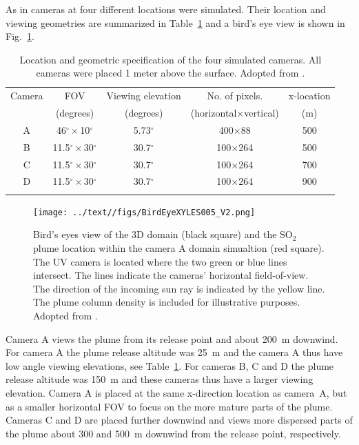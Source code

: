 \documentclass[amtd, manuscript]{copernicus}
\begin{document}
As in \citet{Kylling2020} cameras at four different locations were
simulated. Their location and viewing geometries are summarized in
Table~\ref{tab:CameraInfo} and a bird's eye view is shown in Fig.~\ref{fig:ExpSetup}.
\begin{table}[t]
  \caption[]
          {\label{tab:CameraInfo}
            Location and geometric specification of the four simulated cameras.
            All cameras  were placed 1 meter above the
            surface. Adopted from  \citet{Kylling2020}.}
          \begin{tabular}{ccccc}
            \tophline
            Camera & FOV & Viewing elevation &          No. of pixels. & x-location \\
            & (degrees)  &  (degrees) & (horizontal$\times$vertical)& (m)\\
            \middlehline
            A & 46$^\circ\times$10$^\circ$ & 5.73$^\circ$ & 400$\times$88 &  500   \\
            B & 11.5$^\circ\times$30$^\circ$ & 30.7$^\circ$ & 100$\times$264 &  500   \\
            C & 11.5$^\circ\times$30$^\circ$ & 30.7$^\circ$ & 100$\times$264 &  700   \\
            D & 11.5$^\circ\times$30$^\circ$ & 30.7$^\circ$ & 100$\times$264 &  900   \\
            \bottomhline
          \end{tabular}
\end{table}
\begin{figure}[!htb]
  \begin{center}
    \texttt{[image: ../text//figs/BirdEyeXYLES005\_V2.png]}
    \caption{\label{fig:ExpSetup} Bird's eyes view of the
      3D domain (black square) and the SO$_2$ plume location
      within the camera A domain simualtion (red square).
      The UV camera is located where the two green or blue lines
      intersect. The lines indicate  the cameras' horizontal field-of-view.
      The direction of the incoming sun ray is indicated by the yellow line.
      The plume column density is included for illustrative purposes.
      Adopted from  \citet{Kylling2020}.
    }
  \end{center}
\end{figure}
Camera A views the plume from its release point and
about 200~m downwind. For camera A the plume release altitude was 25~m
and the camera A thus have low angle viewing elevations, see
Table~\ref{tab:CameraInfo}.
For cameras B, C and D the plume release altitude was 150~m and these
cameras thus  have a larger viewing elevation. Camera A is placed at the same x-direction
location as camera~A, but as a smaller horizontal FOV to focus on the
more mature parts of the plume. Cameras C and D are placed further
downwind and views more dispersed parts of the plume about 300 and
500~m downwind from the release point, respectively.
\end{document}

